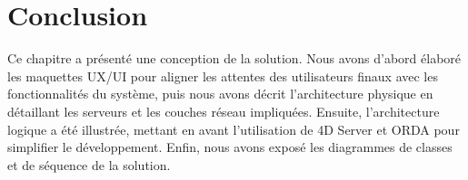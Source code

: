 \section{Conclusion}
Ce chapitre a présenté une conception 
de la solution. Nous avons d'abord 
élaboré les maquettes UX/UI pour aligner les attentes 
des utilisateurs finaux avec les fonctionnalités 
du système, puis nous avons décrit l'architecture 
physique en détaillant les serveurs et les couches 
réseau impliquées. Ensuite, l'architecture logique 
a été illustrée, mettant en avant l'utilisation de 
4D Server et ORDA pour simplifier le développement. 
Enfin, nous avons exposé les diagrammes de classes 
et de séquence de la solution.